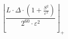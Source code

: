 \[\left\lfloor \frac{L \cdot \Delta \cdot \left(1 + \frac{S^{2}}{\varepsilon^{2}}\right)}{2^{60} \cdot \varepsilon^{2}} \right\rfloor_{+}\]
